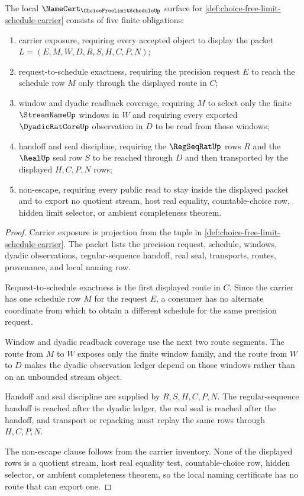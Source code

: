 \begin{theorem}
\label{thm:choice-free-limit-schedule-namecert-obligations}
The local $\NameCert_{\ChoiceFreeLimitScheduleUp}$ surface for \autoref{def:choice-free-limit-schedule-carrier} consists of five finite obligations:
\begin{enumerate}
\item carrier exposure, requiring every accepted object to display the packet $L=(E,M,W,D,R,S,H,C,P,N)$;
\item request-to-schedule exactness, requiring the precision request $E$ to reach the schedule row $M$ only through the displayed route in $C$;
\item window and dyadic readback coverage, requiring $M$ to select only the finite $\StreamNameUp$ windows in $W$ and requiring every exported $\DyadicRatCoreUp$ observation in $D$ to be read from those windows;
\item handoff and seal discipline, requiring the $\RegSeqRatUp$ rows $R$ and the $\RealUp$ seal row $S$ to be reached through $D$ and then transported by the displayed $H,C,P,N$ rows;
\item non-escape, requiring every public read to stay inside the displayed packet and to export no quotient stream, host real equality, countable-choice row, hidden limit selector, or ambient completeness theorem.
\end{enumerate}
\end{theorem}
\begin{proof}
Carrier exposure is projection from the tuple in \autoref{def:choice-free-limit-schedule-carrier}. The packet lists the precision request, schedule, windows, dyadic observations, regular-sequence handoff, real seal, transports, routes, provenance, and local naming row.

Request-to-schedule exactness is the first displayed route in $C$. Since the carrier has one schedule row $M$ for the request $E$, a consumer has no alternate coordinate from which to obtain a different schedule for the same precision request.

Window and dyadic readback coverage use the next two route segments. The route from $M$ to $W$ exposes only the finite window family, and the route from $W$ to $D$ makes the dyadic observation ledger depend on those windows rather than on an unbounded stream object.

Handoff and seal discipline are supplied by $R,S,H,C,P,N$. The regular-sequence handoff is reached after the dyadic ledger, the real seal is reached after the handoff, and transport or repacking must replay the same rows through $H,C,P,N$.

The non-escape clause follows from the carrier inventory. None of the displayed rows is a quotient stream, host real equality test, countable-choice row, hidden selector, or ambient completeness theorem, so the local naming certificate has no route that can export one.
\end{proof}

